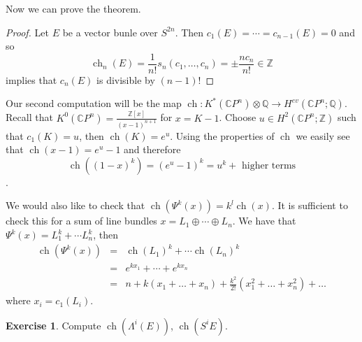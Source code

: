 \documentclass[a4paper,10pt]{article}
\theoremstyle{plain}%
\theoremstyle{definition}
\newtheorem{exer}{Exercise}
\theoremstyle{remark}
\newcommand{\ZZ}{\mathbb{Z}}
\newcommand{\CC}{\mathbb{C}}
\newcommand{\QQ}{\mathbb{Q}}
\newcommand{\cp}{\CC P}   %
\DeclareMathOperator{\ch}{ch}
\begin{document}
Now we can prove the theorem.
\begin{proof}
Let $E$ be a vector bunle over $S^{2n}$. Then $c_1(E)=\cdots=c_{n-1}(E)=0$ and so
\[
\ch_n(E) = \frac{1}{n!}s_n(c_1,\ldots,c_n) = \pm \frac{nc_n}{n!} \in \ZZ
\] implies that $c_n(E)$ is divisible by $(n-1)!$
\end{proof}

Our second computation will be the map $\ch:K^*(\cp^n)\otimes \QQ\to H^{ev}(\cp^n;\QQ)$. Recall that $K^0(\cp^n)= \frac{\ZZ[x]}{(x-1)^{n+1}}$ for $x= K-1$. Choose $u\in H^2(\cp^n;\ZZ)$ such that $c_1(K)=u$, then $\ch (K)=e^u$. Using the properties of $\ch$ we easily see that $\ch(x-1)=e^u-1$ and therefore
\[
\ch((1-x)^k)=(e^u-1)^k = u^k + \text{ higher terms}
\].

We would also like to check that $\ch(\Psi^k(x)) = k^l \ch(x)$. It is sufficient to check this for a sum of line bundles $x=L_1\oplus\cdots\oplus L_n$. We have that $\Psi^k(x) = L_1^k+\cdots L_n^k$, then
\[\begin{array}{rcl}
\ch(\Psi^k(x)) &=& \ch(L_1)^k+\cdots \ch(L_n)^k\\
			   &=& e^{kx_1} + \cdots + e^{kx_n}\\
			   &=& n + k(x_1+\ldots+x_n)+\frac{k^2}{2!}(x_1^2+\ldots+x_n^2) + \ldots
\end{array}
\] where $x_i = c_1(L_i)$.


\begin{exer}
Compute $\ch(\Lambda^i(E))$, $\ch(S^i E)$.
\end{exer}
\end{document}
